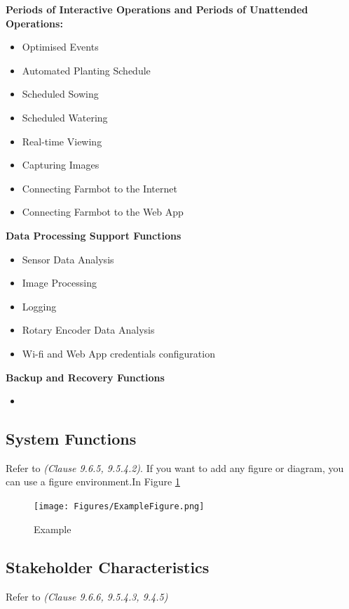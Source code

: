 \textbf{Periods of Interactive Operations and Periods of Unattended Operations:}
\begin{itemize}
    \item Optimised Events
    \item Automated Planting Schedule
    \item Scheduled Sowing
    \item Scheduled Watering
    \item Real-time Viewing 
    \item Capturing Images
    \item Connecting Farmbot to the Internet
    \item Connecting Farmbot to the Web App
\end{itemize}


\textbf{Data Processing Support Functions}
\begin{itemize}
    \item Sensor Data Analysis
    \item Image Processing
    \item Logging
    \item Rotary Encoder Data Analysis
    \item Wi-fi and Web App credentials configuration
\end{itemize}


\textbf{Backup and Recovery Functions}
\begin{itemize}
    \item 
\end{itemize}


\subsection{System Functions}

Refer to \textit{(Clause 9.6.5, 9.5.4.2)}. If you want to add any figure or diagram, you can use a figure environment.In Figure \ref{Fig:Example}

\begin{figure}[ht]
\centering
\texttt{[image: Figures/ExampleFigure.png]}
\caption{Example \label{Fig:Example}}
\end{figure}


\subsection{Stakeholder Characteristics}

Refer to \textit{(Clause 9.6.6, 9.5.4.3, 9.4.5)}

